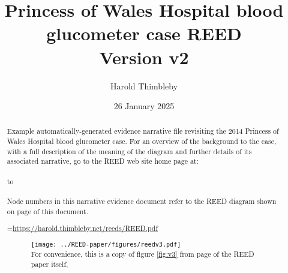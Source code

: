 \title{Princess of Wales Hospital blood glucometer case REED\\Version v2}\author{Harold Thimbleby}
\date{26 January 2025}
 \maketitle
\def\colorflag#1{\fboxrule=0.3pt
\fboxsep=0pt
\hbox{\vrule height 2.2ex width 1pt
\raise 1ex\hbox{\fbox{\color{#1}\hbox{\vrule width .5ex height 1ex depth 0ex}}}%
\hskip -.6pt\raise .9ex\hbox{\fbox{\color{#1}\hbox{\vrule width .5ex height 1ex depth 0ex}}}%
\hskip -.6pt\raise 1ex\hbox{\fbox{\color{#1}\hbox{\vrule width .7ex height 1ex depth 0ex}}}}%
}
\begin{abstract}
\noindent
Example automatically-generated evidence narrative file revisiting the 2014 Princess of Wales Hospital blood glucometer case. For an overview of the background to the case, with a full description of the meaning of the diagram and further details of its associated narrative, go to  
the REED web site home page at: \\ \\ \hbox to  \\ \\
Node numbers in this narrative evidence document refer to the REED diagram shown on page \pageref{thefigure} of this document.

=\hbox{\textcolor{blue}{\url{https://harold.thimbleby.net/reeds/REED.pdf}}}

\begin{figure}\texttt{[image: ../REED-paper/figures/reedv3.pdf]}\\
\sf For convenience, this is a copy of figure \ref{fig:v3} from page \pageref{fig:v3} of the REED paper itself,\\ 
\label{thefigure}
\end{figure}\newpage

\end{abstract}
